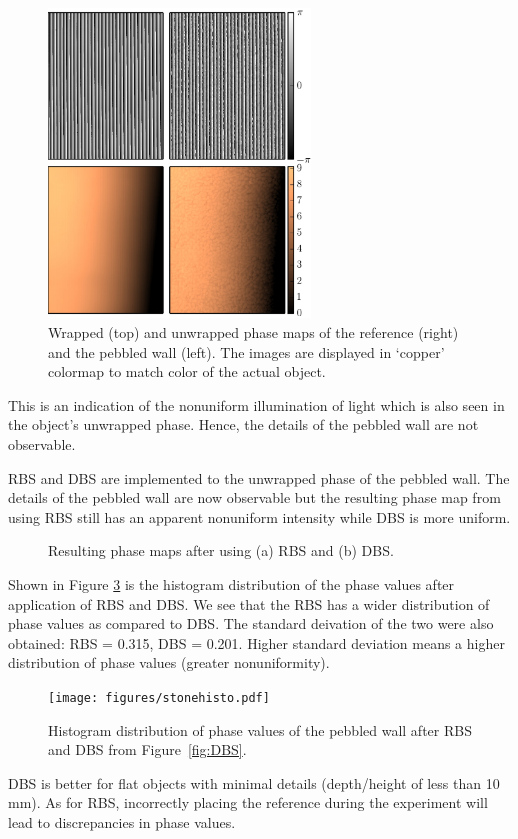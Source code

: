 \captionsetup[figure]{width=5in}
\begin{figure}[h!]
	\centering
	\includegraphics[width=0.62\textwidth]{figures/stone_copper.jpg}
	\caption{Wrapped (top) and unwrapped phase maps of the reference (right) and the pebbled wall (left). The images are displayed in `copper' colormap to match color of the actual object.}
	\label{fig:stone}
\end{figure}

This is an indication of the nonuniform illumination of light which is also seen in the object's unwrapped phase. 
Hence, the details of the pebbled wall are not observable.

RBS and DBS are implemented to the unwrapped phase of the pebbled wall. 
The details of the pebbled wall are now observable but the resulting phase map from using RBS still has an apparent nonuniform intensity while DBS is more uniform. 

\captionsetup[figure]{width=5in}
\begin{figure}[h!t]
	\centering
	\caption{Resulting phase maps after using (a) RBS and (b) DBS.}
	\label{fig:stoneBS}
\end{figure}

Shown in Figure \ref{fig:stonehist} is the histogram distribution of the phase values after application of RBS and DBS. We see that the RBS has a wider distribution of phase values as compared to DBS. The standard deivation of the two were also obtained: RBS = 0.315, DBS = 0.201. Higher standard deviation means a higher distribution of phase values (greater nonuniformity). 


\captionsetup[figure]{width=5in}
\begin{figure}[h!]
	\centering
	\texttt{[image: figures/stonehisto.pdf]}
	\caption{Histogram distribution of phase values of the pebbled wall after RBS and DBS from Figure~\ref{fig:DBS}.}
	\label{fig:stonehist}
\end{figure}

DBS is better for flat objects with minimal details (depth/height of less than 10 mm). As for RBS, incorrectly placing the reference during the experiment will lead to discrepancies in phase values.
